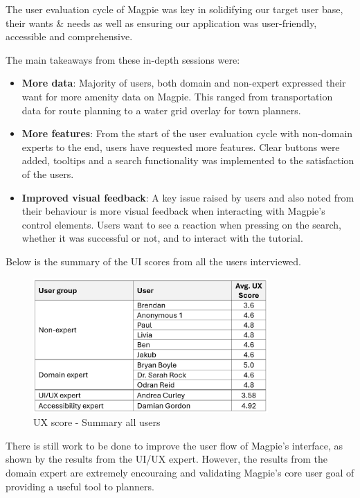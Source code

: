The user evaluation cycle of Magpie was key in solidifying our target user base,
their wants \& needs as well as ensuring our application was user-friendly,
accessible and comprehensive.

The main takeaways from these in-depth sessions were:
\begin{itemize}
    \item \textbf{More data}: Majority of users, both domain and non-expert
          expressed their want for more amenity data on Magpie. This ranged from
          transportation data for route planning to a water grid overlay for town
          planners.

    \item \textbf{More features}: From the start of the user evaluation cycle
          with non-domain experts to the end, users have requested more features.
          Clear buttons were added, tooltips and a search functionality was
          implemented to the satisfaction of the users.

    \item \textbf{Improved visual feedback}: A key issue raised by users and
          also noted from their behaviour is more visual feedback when interacting
          with Magpie's control elements. Users want to see a reaction when pressing
          on the search, whether it was successful or not, and to interact with the tutorial.
\end{itemize}

Below is the summary of the UI scores from all the users interviewed.
\begin{figure}[h!]
    \centering
    \includegraphics[width=0.8\textwidth]{images/ux-score-summary.png}
    \caption{UX score - Summary all users}
\end{figure}
There is still work to be done to improve the user flow of Magpie's interface, as shown by the results from the UI/UX expert. However, the results from the domain expert are extremely encouraing and validating Magpie's core user goal of providing a useful tool to planners.